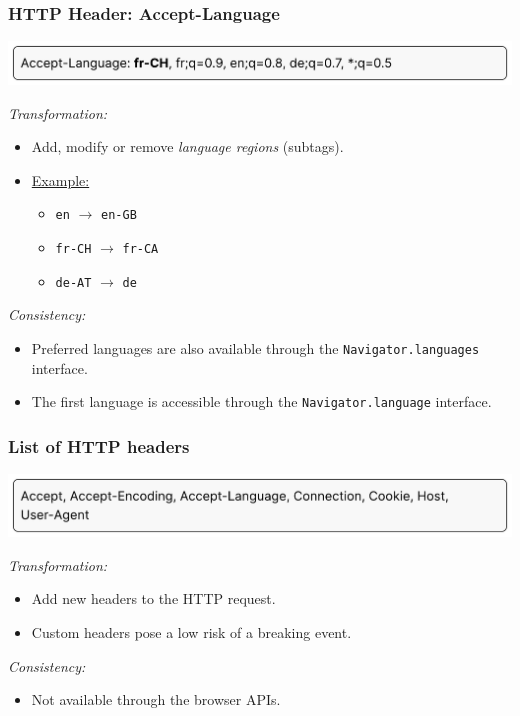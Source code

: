 \begin{frame}
	\frametitle{HTTP Header: Accept-Language}
	
	\includegraphics[width=\textwidth]{img/accept-language.pdf}
	
	\bigskip
	
	\emph{Transformation:}
	
	\begin{itemize}
		\item Add, modify or remove \emph{language regions} (subtags).
		\item \underline{Example:}
			\begin{itemize}
				\item \texttt{en} $\rightarrow$ \texttt{en-GB}
				\item \texttt{fr-CH} $\rightarrow$ \texttt{fr-CA}
				\item \texttt{de-AT} $\rightarrow$ \texttt{de}
			\end{itemize}
	\end{itemize}
	
	\medskip
	
	\emph{Consistency:}
	
	\begin{itemize}
		\item Preferred languages are also available through the \texttt{Navigator.languages} interface.
		\item The first language is accessible through the \texttt{Navigator.language} interface.
	\end{itemize}
\end{frame}

\begin{frame}
	\frametitle{List of HTTP headers}
	
	\includegraphics[width=\textwidth]{img/http-headers.pdf}
	
	\bigskip
	
	\emph{Transformation:}
	
	\begin{itemize}
		\item Add new headers to the HTTP request.
		\item Custom headers pose a low risk of a breaking event.
	\end{itemize}
	
	\medskip
	
	\emph{Consistency:}
	
	\begin{itemize}
		\item Not available through the browser APIs.
	\end{itemize}
\end{frame}

